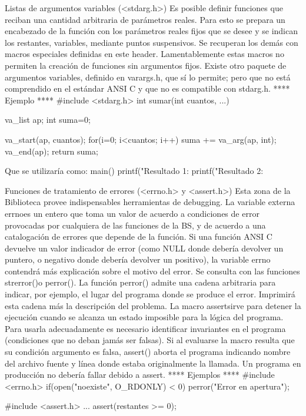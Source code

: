 Listas de argumentos variables (<stdarg.h>)
Es posible definir funciones que reciban una cantidad arbitraria de parámetros
reales. Para esto se prepara un encabezado de la función con los parámetros
reales fijos que se desee y se indican los restantes, variables, mediante
puntos suspensivos. Se recuperan los demás con macros especiales definidas en
este header.
Lamentablemente estas macros no permiten la creación de funciones sin
argumentos fijos. Existe otro paquete de argumentos variables, definido en
varargs.h, que sí lo permite; pero que no está comprendido en el estándar ANSI
C y que no es compatible con stdarg.h.
**** Ejemplo ****
    #include <stdarg.h>
    int sumar(int cuantos, ...)
    {
        va_list ap;
        int suma=0;

        va_start(ap, cuantos);
        for(i=0; i<cuantos; i++)
            suma += va_arg(ap, int);
        va_end(ap);
        return suma;
   }
Que se utilizaría como:
    main()
    {
        printf("Resultado 1: %
        printf("Resultado 2: %
    }

Funciones de tratamiento de errores (<errno.h> y <assert.h>)
Esta zona de la Biblioteca provee indispensables herramientas de debugging. La
variable externa errnoes un entero que toma un valor de acuerdo a condiciones
de error provocadas por cualquiera de las funciones de la BS, y de acuerdo a
una catalogación de errores que depende de la función. Si una función ANSI C
devuelve un valor indicador de error (como NULL donde debería devolver un
puntero, o negativo donde debería devolver un positivo), la variable errno
contendrá más explicación sobre el motivo del error. Se consulta con las
funciones strerror()o perror(). La función perror() admite una cadena
arbitraria para indicar, por ejemplo, el lugar del programa donde se produce el
error. Imprimirá esta cadena más la descripción del problema.
La macro assertsirve para detener la ejecución cuando se alcanza un estado
imposible para la lógica del programa. Para usarla adecuadamente es necesario
identificar invariantes en el programa (condiciones que no deban jamás ser
falsas). Si al evaluarse la macro resulta que su condición argumento es falsa,
assert() aborta el programa indicando nombre del archivo fuente y línea donde
estaba originalmente la llamada. Un programa en producción no debería fallar
debido a assert.
**** Ejemplos ****
    #include <errno.h>
    if(open("noexiste", O_RDONLY) < 0)
        perror("Error en apertura");


    #include <assert.h>
    ...
    assert(restantes >= 0);


